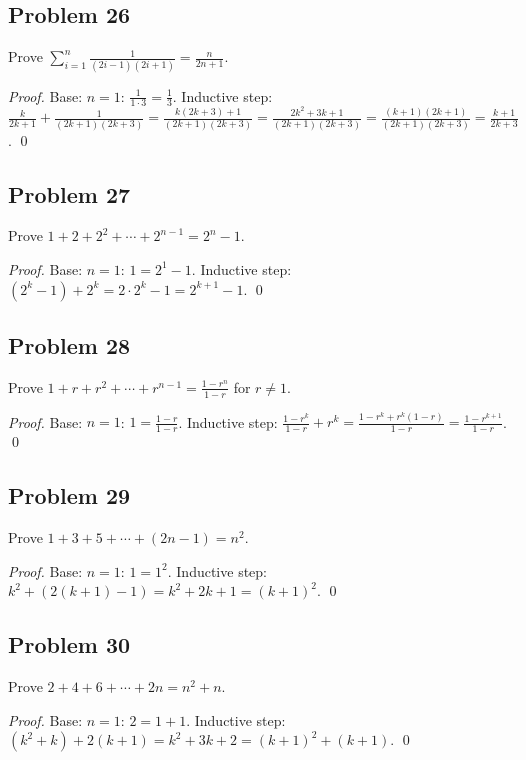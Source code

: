 \subsection*{Problem 26}
Prove $\sum_{i=1}^{n} \frac{1}{(2i-1)(2i+1)} = \frac{n}{2n+1}$.

\textit{Proof.} Base: $n=1$: $\frac{1}{1 \cdot 3} = \frac{1}{3}$. Inductive step:
$\frac{k}{2k+1} + \frac{1}{(2k+1)(2k+3)} = \frac{k(2k+3)+1}{(2k+1)(2k+3)} = \frac{2k^2+3k+1}{(2k+1)(2k+3)} = \frac{(k+1)(2k+1)}{(2k+1)(2k+3)} = \frac{k+1}{2k+3}$. \qed

\subsection*{Problem 27}
Prove $1 + 2 + 2^2 + \cdots + 2^{n-1} = 2^n - 1$.

\textit{Proof.} Base: $n=1$: $1 = 2^1 - 1$. Inductive step:
$(2^k - 1) + 2^k = 2 \cdot 2^k - 1 = 2^{k+1} - 1$. \qed

\subsection*{Problem 28}
Prove $1 + r + r^2 + \cdots + r^{n-1} = \frac{1-r^n}{1-r}$ for $r \neq 1$.

\textit{Proof.} Base: $n=1$: $1 = \frac{1-r}{1-r}$. Inductive step:
$\frac{1-r^k}{1-r} + r^k = \frac{1-r^k + r^k(1-r)}{1-r} = \frac{1 - r^{k+1}}{1-r}$. \qed

\subsection*{Problem 29}
Prove $1 + 3 + 5 + \cdots + (2n-1) = n^2$.

\textit{Proof.} Base: $n=1$: $1 = 1^2$. Inductive step:
$k^2 + (2(k+1)-1) = k^2 + 2k + 1 = (k+1)^2$. \qed

\subsection*{Problem 30}
Prove $2 + 4 + 6 + \cdots + 2n = n^2 + n$.

\textit{Proof.} Base: $n=1$: $2 = 1 + 1$. Inductive step:
$(k^2 + k) + 2(k+1) = k^2 + 3k + 2 = (k+1)^2 + (k+1)$. \qed

